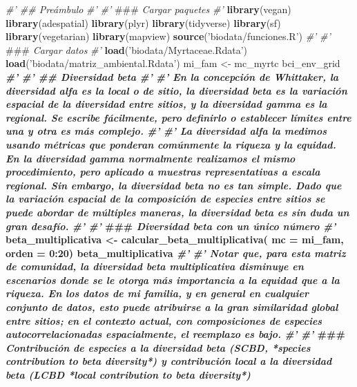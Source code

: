 \documentclass[11pt,]{article}
\newenvironment{Shaded}{\begin{snugshade}}{\end{snugshade}}
\newcommand{\KeywordTok}[1]{\textcolor[rgb]{0.13,0.29,0.53}{\textbf{#1}}}
\newcommand{\DataTypeTok}[1]{\textcolor[rgb]{0.13,0.29,0.53}{#1}}
\newcommand{\DecValTok}[1]{\textcolor[rgb]{0.00,0.00,0.81}{#1}}
\newcommand{\StringTok}[1]{\textcolor[rgb]{0.31,0.60,0.02}{#1}}
\newcommand{\CommentTok}[1]{\textcolor[rgb]{0.56,0.35,0.01}{\textit{#1}}}
\newcommand{\OperatorTok}[1]{\textcolor[rgb]{0.81,0.36,0.00}{\textbf{#1}}}
\newcommand{\AlertTok}[1]{\textcolor[rgb]{0.94,0.16,0.16}{#1}}
\newcommand{\NormalTok}[1]{#1}
\begin{document}
\begin{Shaded}
\begin{Highlighting}[]
\CommentTok{#' ## Preámbulo}
\CommentTok{#' }
\CommentTok{#' }\AlertTok{###}\CommentTok{ Cargar paquetes}
\CommentTok{#' }
\KeywordTok{library}\NormalTok{(vegan)}
\KeywordTok{library}\NormalTok{(adespatial)}
\KeywordTok{library}\NormalTok{(plyr)}
\KeywordTok{library}\NormalTok{(tidyverse)}
\KeywordTok{library}\NormalTok{(sf)}
\KeywordTok{library}\NormalTok{(vegetarian)}
\KeywordTok{library}\NormalTok{(mapview)}
\KeywordTok{source}\NormalTok{(}\StringTok{'biodata/funciones.R'}\NormalTok{)}
\CommentTok{#' }
\CommentTok{#' }\AlertTok{###}\CommentTok{ Cargar datos}
\CommentTok{#' }
\KeywordTok{load}\NormalTok{(}\StringTok{'biodata/Myrtaceae.Rdata'}\NormalTok{)}
\KeywordTok{load}\NormalTok{(}\StringTok{'biodata/matriz_ambiental.Rdata'}\NormalTok{)}
\NormalTok{mi_fam <-}\StringTok{ }\NormalTok{mc_myrtc}
\NormalTok{bci_env_grid }\OperatorTok{%
\CommentTok{#' }
\CommentTok{#' ## Diversidad beta}
\CommentTok{#' }
\CommentTok{#' En la concepción de Whittaker, la diversidad alfa es la local o de sitio, la diversidad beta es la variación espacial de la diversidad entre sitios, y la diversidad gamma es la regional. Se escribe fácilmente, pero definirlo o establecer límites entre una y otra es más complejo.}
\CommentTok{#' }
\CommentTok{#' La diversidad alfa la medimos usando métricas que ponderan comúnmente la riqueza y la equidad. En la diversidad gamma normalmente realizamos el mismo procedimiento, pero aplicado a muestras representativas a escala regional. Sin embargo, la diversidad beta no es tan simple. Dado que la variación espacial de la composición de especies entre sitios se puede abordar de múltiples maneras, la diversidad beta es sin duda un gran desafío.}
\CommentTok{#' }
\CommentTok{#' }\AlertTok{###}\CommentTok{ Diversidad beta con un único número}
\CommentTok{#' }
\NormalTok{beta_multiplicativa <-}\StringTok{ }\KeywordTok{calcular_beta_multiplicativa}\NormalTok{(}
  \DataTypeTok{mc =}\NormalTok{ mi_fam,}
  \DataTypeTok{orden =} \DecValTok{0}\OperatorTok{:}\DecValTok{20}\NormalTok{)}
\NormalTok{beta_multiplicativa}
\CommentTok{#' }
\CommentTok{#' Notar que, para esta matriz de comunidad, la diversidad beta multiplicativa disminuye en escenarios donde se le otorga más importancia a la equidad que a la riqueza. En los datos de mi familia, y en general en cualquier conjunto de datos, esto puede atribuirse a la gran similaridad global entre sitios; en el contexto actual, con composiciones de especies autocorrelacionadas espacialmente, el reemplazo es bajo.}
\CommentTok{#' }
\CommentTok{#' }\AlertTok{###}\CommentTok{ Contribución de especies a la diversidad beta (SCBD, *species contribution to beta diversity*) y contribución local a la diversidad beta (LCBD *local contribution to beta diversity*)}
}
\end{Highlighting}
\end{Shaded}
\end{document}
